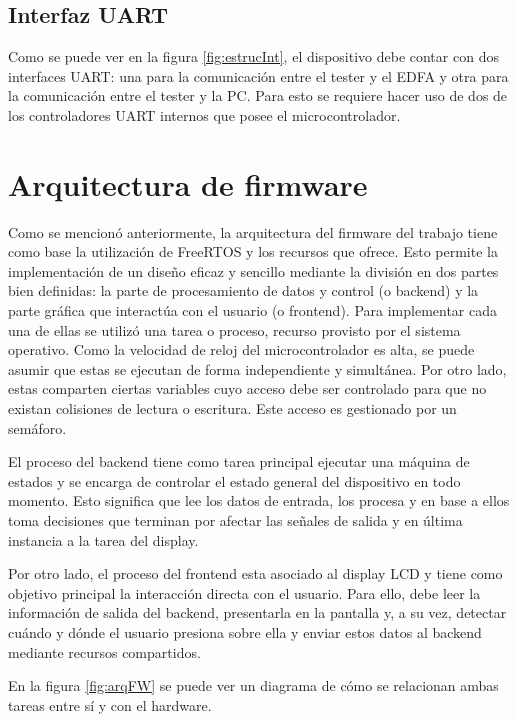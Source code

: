 \subsection{Interfaz UART}

Como se puede ver en la figura \ref{fig:estrucInt}, el dispositivo debe contar con dos interfaces UART: una para la comunicación entre el tester y el EDFA y otra para la comunicación entre el tester y la PC. Para esto se requiere hacer uso de dos de los controladores UART internos que posee el microcontrolador.

\section{Arquitectura de firmware}

Como se mencionó anteriormente, la arquitectura del firmware del trabajo tiene como base la utilización de FreeRTOS y los recursos que ofrece. Esto permite la implementación de un diseño eficaz y sencillo mediante la división en dos partes bien definidas: la parte de procesamiento de datos y control (o backend) y la parte gráfica que interactúa con el usuario (o frontend). Para implementar cada una de ellas se utilizó una tarea o proceso, recurso provisto por el sistema operativo. Como la velocidad de reloj del microcontrolador es alta, se puede asumir que estas se ejecutan de forma independiente y simultánea. Por otro lado, estas comparten ciertas variables cuyo acceso debe ser controlado para que no existan colisiones de lectura o escritura. Este acceso es gestionado por un semáforo.

El proceso del backend tiene como tarea principal ejecutar una máquina de estados y se encarga de controlar el estado general del dispositivo en todo momento. Esto significa que lee los datos de entrada, los procesa y en base a ellos toma decisiones que terminan por afectar las señales de salida y en última instancia a la tarea del display.

Por otro lado, el proceso del frontend esta asociado al display LCD y tiene como objetivo principal la interacción directa con el usuario. Para ello, debe leer la información de salida del backend, presentarla en la pantalla y, a su vez, detectar cuándo y dónde el usuario presiona sobre ella y enviar estos datos al backend mediante recursos compartidos. 

En la figura \ref{fig:arqFW} se puede ver un diagrama de cómo se relacionan ambas tareas entre sí y con el hardware.


